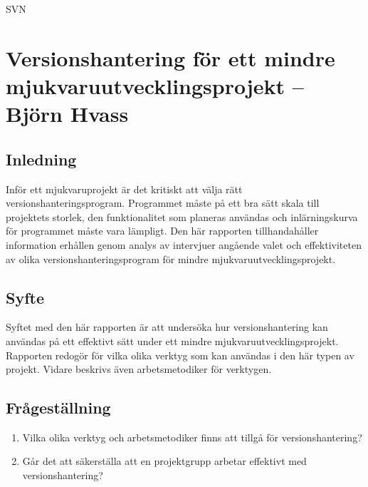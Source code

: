 SVN

\chapter{Versionshantering för ett mindre mjukvaruutvecklingsprojekt -- Björn Hvass}

\section{Inledning}
Inför ett mjukvaruprojekt är det kritiskt att välja rätt versionshanteringsprogram. Programmet måste på ett bra sätt skala till projektets storlek, den funktionalitet som planeras användas och inlärningskurva för programmet måste vara lämpligt. Den här rapporten tillhandahåller information erhållen genom analys av intervjuer angående valet och effektiviteten av olika versionshanteringsprogram för mindre mjukvaruutvecklingsprojekt.

\section{Syfte}
Syftet med den här rapporten är att undersöka hur versionshantering kan användas på ett effektivt sätt under ett mindre mjukvaruutvecklingsprojekt. Rapporten redogör för vilka olika verktyg som kan användas i den här typen av projekt. Vidare beskrivs även arbetsmetodiker för verktygen.

\section{Frågeställning}
\begin{enumerate}
    \item Vilka olika verktyg och arbetsmetodiker finns att tillgå för versionshantering?
    \item Går det att säkerställa att en projektgrupp arbetar effektivt med versionshantering?
\end{enumerate}

